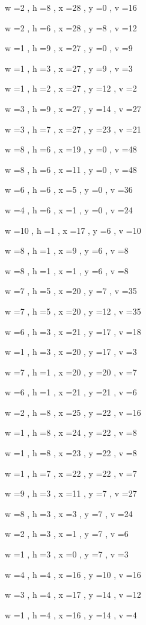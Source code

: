 \documentclass[11pt]{article}
\begin{document}
w =2 , h =8 , x =28 , y =0 , v =16
\par
w =2 , h =6 , x =28 , y =8 , v =12
\par
w =1 , h =9 , x =27 , y =0 , v =9
\par
w =1 , h =3 , x =27 , y =9 , v =3
\par
w =1 , h =2 , x =27 , y =12 , v =2
\par
w =3 , h =9 , x =27 , y =14 , v =27
\par
w =3 , h =7 , x =27 , y =23 , v =21
\par
w =8 , h =6 , x =19 , y =0 , v =48
\par
w =8 , h =6 , x =11 , y =0 , v =48
\par
w =6 , h =6 , x =5 , y =0 , v =36
\par
w =4 , h =6 , x =1 , y =0 , v =24
\par
w =10 , h =1 , x =17 , y =6 , v =10
\par
w =8 , h =1 , x =9 , y =6 , v =8
\par
w =8 , h =1 , x =1 , y =6 , v =8
\par
w =7 , h =5 , x =20 , y =7 , v =35
\par
w =7 , h =5 , x =20 , y =12 , v =35
\par
w =6 , h =3 , x =21 , y =17 , v =18
\par
w =1 , h =3 , x =20 , y =17 , v =3
\par
w =7 , h =1 , x =20 , y =20 , v =7
\par
w =6 , h =1 , x =21 , y =21 , v =6
\par
w =2 , h =8 , x =25 , y =22 , v =16
\par
w =1 , h =8 , x =24 , y =22 , v =8
\par
w =1 , h =8 , x =23 , y =22 , v =8
\par
w =1 , h =7 , x =22 , y =22 , v =7
\par
w =9 , h =3 , x =11 , y =7 , v =27
\par
w =8 , h =3 , x =3 , y =7 , v =24
\par
w =2 , h =3 , x =1 , y =7 , v =6
\par
w =1 , h =3 , x =0 , y =7 , v =3
\par
w =4 , h =4 , x =16 , y =10 , v =16
\par
w =3 , h =4 , x =17 , y =14 , v =12
\par
w =1 , h =4 , x =16 , y =14 , v =4
\par
\newpage
\end{document}
